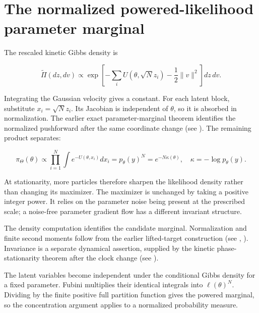 \documentclass[11pt,a4paper]{report}
\begin{document}
\section{\texorpdfstring{The normalized powered-likelihood parameter marginal}{The normalized powered-likelihood parameter marginal}}


The rescaled kinetic Gibbs density is


\[\widetilde\Pi(dz,dv)\propto
\exp\left[-\sum_iU(\theta,\sqrt Nz_i)-\frac12\|v\|^2\right]dz\,dv.\]


Integrating the Gaussian velocity gives a constant. For each latent block,
substitute \(x_i=\sqrt Nz_i\). Its Jacobian is independent of \(\theta\),
so it is absorbed in normalization. The earlier exact parameter-marginal theorem identifies the normalized pushforward after the same coordinate change (see \cite[Section~3.9.9]{LangevinLean2026IPLA}). The remaining product separates:


\[\pi_\Theta(\theta)\propto
\prod_{i=1}^N\int e^{-U(\theta,x_i)}dx_i
=p_\theta(y)^N=e^{-N\kappa(\theta)},\quad
\kappa=-\log p_\theta(y).\]


At stationarity, more particles therefore sharpen the likelihood density
rather than changing its maximizer. The maximizer is unchanged by taking a positive integer power.
It relies on the parameter noise being present at the prescribed scale; a
noise-free parameter gradient flow has a different invariant structure.




The density computation identifies the candidate marginal. Normalization and finite second moments follow from the earlier lifted-target construction (see \cite[Section~3.5.1]{LangevinLean2026IPLA}, \cite[Section~3.5.1]{LangevinLean2026IPLA}). Invariance is a separate dynamical assertion, supplied by the kinetic phase-stationarity theorem after the clock change (see \cite[Section~3.58.3]{LangevinLean2026Kinetic}).



The latent variables become independent under the conditional Gibbs density for a fixed parameter. Fubini multiplies their identical integrals into \(\ell(\theta)^N\). Dividing by the finite positive full partition function gives the powered marginal, so the concentration argument applies to a normalized probability measure.
\end{document}
